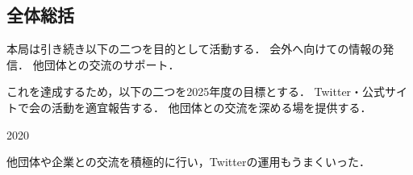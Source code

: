 \subsection*{全体総括}


本局は引き続き以下の二つを目的として活動する．
    会外へ向けての情報の発信．
    他団体との交流のサポート．
 
これを達成するため，以下の二つを2025年度の目標とする．
    Twitter・公式サイトで会の活動を適宜報告する．
    他団体との交流を深める場を提供する．

    2020

他団体や企業との交流を積極的に行い，Twitterの運用もうまくいった．
